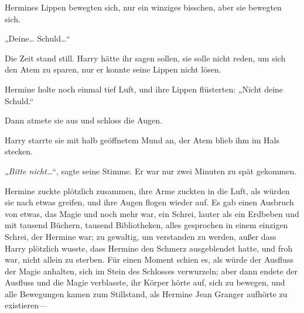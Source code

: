 Hermines Lippen bewegten sich, nur ein winziges bisschen, aber sie bewegten sich.

„Deine… Schuld…“

Die Zeit stand still. Harry hätte ihr sagen sollen, sie solle nicht reden, um sich den Atem zu sparen, nur er konnte seine Lippen nicht lösen.

Hermine holte noch einmal tief Luft, und ihre Lippen flüsterten:
„Nicht deine Schuld.“

Dann atmete sie aus und schloss die Augen.

Harry starrte sie mit halb geöffnetem Mund an, der Atem blieb ihm im Hals stecken.

„\emph{Bitte nicht…}“, sagte seine Stimme. Er war nur zwei Minuten zu spät gekommen.

Hermine zuckte plötzlich zusammen, ihre Arme zuckten in die Luft, als würden sie nach etwas greifen, und ihre Augen flogen wieder auf. Es gab einen Ausbruch von etwas, das Magie und noch mehr war, ein Schrei, lauter als ein Erdbeben und mit tausend Büchern, tausend Bibliotheken, alles gesprochen in einem einzigen Schrei, der Hermine war; zu gewaltig, um verstanden zu werden, außer dass Harry plötzlich wusste, dass Hermine den Schmerz ausgeblendet hatte, und froh war, nicht allein zu sterben. Für einen Moment schien es, als würde der Ausfluss der Magie anhalten, sich im Stein des Schlosses verwurzeln; aber dann endete der Ausfluss und die Magie verblasste, ihr Körper hörte auf, sich zu bewegen, und alle Bewegungen kamen zum Stillstand, als Hermine Jean Granger aufhörte zu existieren—

